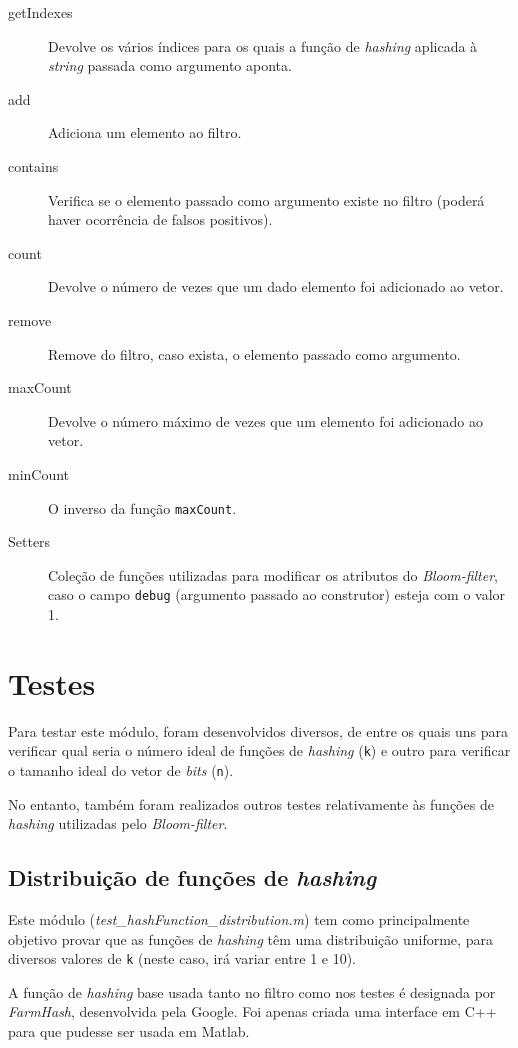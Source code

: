 \documentclass[a4paper,11pt,openright,oneside]{report}
\begin{document}
\begin{description}
\item[getIndexes]
Devolve os vários índices para os quais a função de \textit{hashing} aplicada à \textit{string} passada como argumento aponta.
\item[add]
Adiciona um elemento ao filtro.
\item[contains]
Verifica se o elemento passado como argumento existe no filtro (poderá haver ocorrência de falsos positivos).
\item[count]
Devolve o número de vezes que um dado elemento foi adicionado ao vetor.
\item[remove]
Remove do filtro, caso exista, o elemento passado como argumento.
\item[maxCount]
Devolve o número máximo de vezes que um elemento foi adicionado ao vetor.
\item[minCount]
O inverso da função \texttt{maxCount}.
\item[Setters]
Coleção de funções utilizadas para modificar os atributos do \textit{Bloom-filter}, caso o campo \texttt{debug} (argumento passado ao construtor) esteja com o valor 1.
\end{description}

\section{Testes}
\label{sec.bloomtests}

Para testar este módulo, foram desenvolvidos diversos, de entre os quais uns para verificar qual seria o número ideal de funções de \textit{hashing} (\texttt{k}) e outro para verificar o tamanho ideal do vetor de \textit{bits} (\texttt{n}).

No entanto, também foram realizados outros testes relativamente às funções de \textit{hashing} utilizadas pelo \textit{Bloom-filter}.

\subsection{Distribuição de funções de \textit{hashing}}
\label{subsec.hashdist}

Este módulo (\textit{test_hashFunction_distribution.m}) tem como principalmente objetivo provar que as funções de \textit{hashing} têm uma distribuição uniforme, para diversos valores de \texttt{k} (neste caso, irá variar entre 1 e 10).

A função de \textit{hashing} base usada tanto no filtro como nos testes é designada por \textit{FarmHash}, desenvolvida pela Google. Foi apenas criada uma interface em C++ para que pudesse ser usada em Matlab.
\end{document}
